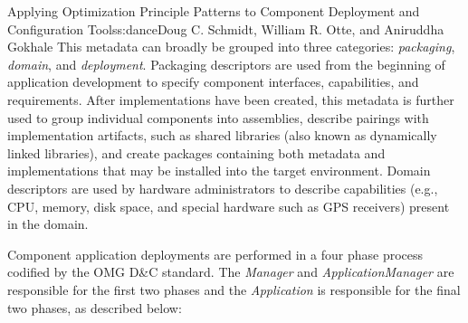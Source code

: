 \begin{aosachapter}{Applying Optimization Principle Patterns to Component Deployment and
                    Configuration Tools}{s:dance}{Doug C. Schmidt, William R. Otte, and Aniruddha Gokhale}
This metadata can broadly be grouped into three categories:
\emph{packaging}, \emph{domain}, and \emph{deployment}. Packaging
descriptors are used from the beginning of application development to
specify component interfaces, capabilities, and requirements. After
implementations have been created, this metadata is further used to
group individual components into assemblies, describe pairings with
implementation artifacts, such as shared libraries (also known as
dynamically linked libraries), and create packages containing both
metadata and implementations that may be installed into the target
environment. Domain descriptors are used by hardware administrators to
describe capabilities (e.g., CPU, memory, disk space, and special
hardware such as GPS receivers) present in the domain.


\label{sec.overview.process}

Component application deployments are performed in a four phase process
codified by the OMG D\&C standard. The \emph{Manager} and
\emph{ApplicationManager} are responsible for the first two phases and
the \emph{Application} is responsible for the final two phases, as
described below:


\end{aosachapter}
